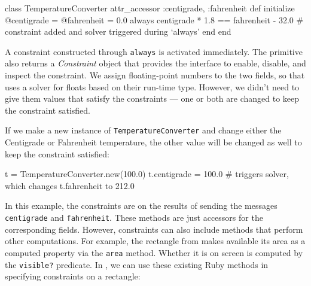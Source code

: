 \begin{code}
class TemperatureConverter
  attr_accessor :centigrade, :fahrenheit
  def initialize
    @centigrade = @fahrenheit = 0.0
    always { centigrade * 1.8 == fahrenheit - 32.0 }
    # constraint added and solver triggered during `always'
  end
end
\end{code}

A constraint constructed through \lstinline{always} is activated
immediately. The primitive also returns a \emph{Constraint} object
that provides the interface to enable, disable, and inspect the
constraint. We assign floating-point numbers to the two fields, so
that \toolname uses a solver for floats based on their run-time
type. However, we didn't need to give them values that satisfy the
constraints --- one or both are changed to keep the constraint
satisfied.

If we make a new instance of \lstinline{TemperatureConverter} and
change either the Centigrade or Fahrenheit temperature, the other
value will be changed as well to keep the constraint satisfied:

\begin{code}
t = TemperatureConverter.new(100.0)
t.centigrade = 100.0 # triggers solver, which changes t.fahrenheit to 212.0
\end{code}




In this example, the constraints are on the results of sending the
messages \lstinline{centigrade} and \lstinline{fahrenheit}. These
methods are just accessors for the corresponding fields.  However,
constraints can also include methods that perform other
computations. For example, the rectangle from
 makes available its area as a computed property
via the \lstinline{area} method.  Whether it is on screen is
computed by the \lstinline{visible?} predicate. In \toolname, we can
use these existing Ruby methods in specifying constraints on a rectangle:

